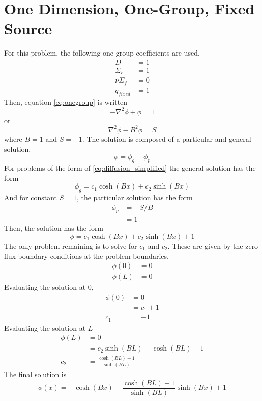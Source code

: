 \section{One Dimension, One-Group, Fixed Source}
  For this problem, the following one-group coefficients are used.
  \begin{align*}
    D &= 1\\
    \Sigma_r &= 1\\
    \nu \Sigma_f &= 0\\
    q_{fixed} &= 1
  \end{align*}
  Then, equation \eqref{eq:onegroup} is written
  \begin{equation}
    - \nabla^2 \phi + \phi = 1 
  \end{equation}
  or
  \begin{equation} \label{eq:diffusion_simplified}
    \nabla^2 \phi - B^2 \phi = S
  \end{equation}
  where $B = 1$ and $S=-1$.
  The solution is composed of a particular and general solution.
  \begin{equation}
    \phi = \phi_g + \phi_p 
  \end{equation}
  For problems of the form of \eqref{eq:diffusion_simplified} the general 
  solution has the form
  \begin{equation} \label{eq:general}
    \phi_g = c_1 \cosh(Bx) + c_2 \sinh(Bx)
  \end{equation}
  And for constant $S=1$, the particular solution has the form
  \begin{align} \label{eq:particular}
    \phi_p &= -S/B \\
    \nonumber &= 1
  \end{align}
  Then, the solution has the form
  \begin{equation} 
    \phi = c_1 \cosh(Bx) + c_2 \sinh(Bx) + 1
  \end{equation}
  The only problem remaining is to solve for $c_1$ and $c_2$. These are given
  by the zero flux boundary conditions at the problem boundaries.
  \begin{align}
    \phi(0) &= 0\\
    \phi(L) &= 0
  \end{align}
  Evaluating the solution at 0, 
  \begin{align}
    \phi(0) &= 0 \\
    &= c_1 + 1\\
    c_1 &= -1
  \end{align}
  Evaluating the solution at $L$
  \begin{align}
    \phi(L) &= 0\\
    &= c_2 \sinh(BL) - \cosh(BL)-1\\
    c_2 &= \frac{\cosh(BL)-1}{\sinh(BL)}
  \end{align}
  The final solution is 
  \begin{equation} \label{eq:one_dimension}
    \phi(x) = -\cosh(Bx) + \frac{\cosh(BL)-1}{\sinh(BL)} \sinh(Bx) +1
  \end{equation}
  
